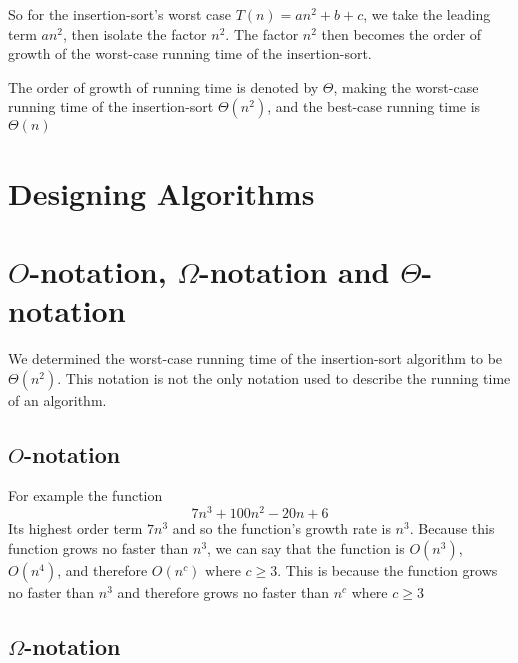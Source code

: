 \documentclass[12pt letter]{report}
\begin{document}
So for the insertion-sort's worst case $T \left( n \right) = an^2 + b + c $, we take the leading term $an^2$, then
isolate the factor $n^2$. The factor $n^2$ then becomes the order of growth of the worst-case running time of the
insertion-sort.

The order of growth of running time is denoted by $\Theta$, making the worst-case running time of the insertion-sort
$\Theta \left( n^2 \right) $, and the best-case running time is $\Theta \left( n \right) $

\section{Designing Algorithms}

\section{$O$-notation, $\Omega$-notation and $\Theta$-notation}

We determined the worst-case running time of the insertion-sort algorithm to be $\Theta \left( n^2 \right) $. This
notation is not the only notation used to describe the running time of an algorithm.

\subsection{$O$-notation}


For example the function
\[
  7n^3 + 100n^2 -20n + 6
\]
Its highest order term $7n^3$ and so the function's growth rate is $n^3$. Because this function grows no faster than
$n^3$, we can say that the function is $O \left( n^3 \right) $, $O \left( n^4 \right) $, and therefore $O \left( n^c \right)
  \text{ where } c\geq 3 $. This is because the function grows no faster than $n^3$ and therefore grows no faster than
$n^c$ where $c \geq 3$

\subsection{$\Omega$-notation}

\end{document}

